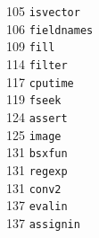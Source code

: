 \begin{footnotesize}
\begin{multicols}{3}
\vspace{-.153cm} 105   \hspace{.2cm} {\tt isvector            }     \\ %
\vspace{-.153cm} 106   \hspace{.2cm} {\tt fieldnames          }     \\ %
\vspace{-.153cm} 109   \hspace{.2cm} {\tt fill                }     \\ %
\vspace{-.153cm} 114   \hspace{.2cm} {\tt filter              }     \\ %
\vspace{-.153cm} 117   \hspace{.2cm} {\tt cputime             }     \\ %
\vspace{-.153cm} 119   \hspace{.2cm} {\tt fseek               }     \\ %
\vspace{-.153cm} 124   \hspace{.2cm} {\tt assert              }     \\ %
\vspace{-.153cm} 125   \hspace{.2cm} {\tt image               }     \\ %
\vspace{-.153cm} 131   \hspace{.2cm} {\tt bsxfun              }     \\ %
\vspace{-.153cm} 131   \hspace{.2cm} {\tt regexp              }     \\ %
\vspace{-.153cm} 131   \hspace{.2cm} {\tt conv2               }     \\ %
\vspace{-.153cm} 137   \hspace{.2cm} {\tt evalin              }     \\ %
\vspace{-.153cm} 137   \hspace{.2cm} {\tt assignin            }     \\ %

\end{multicols}
\end{footnotesize}
